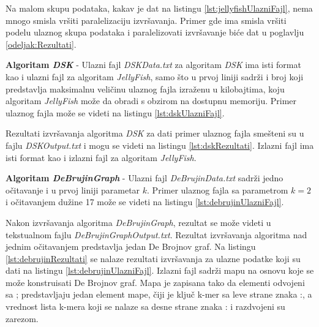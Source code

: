 \documentclass[12pt,oneside]{memoir}
\begin{document}


\begin{minipage}{\linewidth}

\end{minipage}


Na malom skupu podataka, kakav je dat na listingu \ref{lst:jellyfishUlazniFajl}, nema mnogo smisla vršiti paralelizaciju izvršavanja. Primer gde ima smisla vršiti podelu ulaznog skupa podataka i paralelizovati izvršavanje biće dat u poglavlju \ref{odeljak:Rezultati}.

\textbf{Algoritam \textit{DSK}} - Ulazni fajl \textit{DSKData.txt} za algoritam \textit{DSK} ima isti format kao i ulazni fajl za algoritam \textit{JellyFish}, samo što u prvoj liniji sadrži i broj koji predstavlja maksimalnu veličinu ulaznog fajla izraženu u kilobajtima, koju algoritam \textit{JellyFish} može da obradi s obzirom na dostupnu memoriju. Primer ulaznog fajla može se videti na listingu \ref{lst:dskUlazniFajl}.



Rezultati izvršavanja algoritma \textit{DSK} za dati primer ulaznog fajla smešteni su u fajlu \textit{DSKOutput.txt} i mogu se videti na listingu \ref{lst:dskRezultati}. Izlazni fajl ima isti format kao i izlazni fajl za algoritam \textit{JellyFish}.



\textbf{Algoritam \textit{DeBrujinGraph}} - Ulazni fajl \textit{DeBrujinData.txt} sadrži jedno očitavanje i u prvoj liniji parametar $k$. Primer ulaznog fajla sa parametrom $k = 2$ i očitavanjem dužine 17 može se videti na listingu \ref{lst:debrujinUlazniFajl}.



Nakon izvršavanja algoritma \textit{DeBrujinGraph}, rezultat se može videti u tekstualnom fajlu \textit{DeBrujinGraphOutput.txt}. Rezultat izvršavanja algoritma nad jednim očitavanjem predstavlja jedan De Brojnov graf. Na listingu \ref{lst:debrujinRezultati} se nalaze rezultati izvršavanja za ulazne podatke koji su dati na listingu \ref{lst:debrujinUlazniFajl}. Izlazni fajl sadrži mapu na osnovu koje se može konstruisati De Brojnov graf. Mapa je zapisana tako da elementi odvojeni sa ; predstavljaju jedan element mape, čiji je ključ k-mer sa leve strane znaka :, a vrednost lista k-mera koji se nalaze sa
desne strane znaka : i razdvojeni su zarezom.
\end{document}
